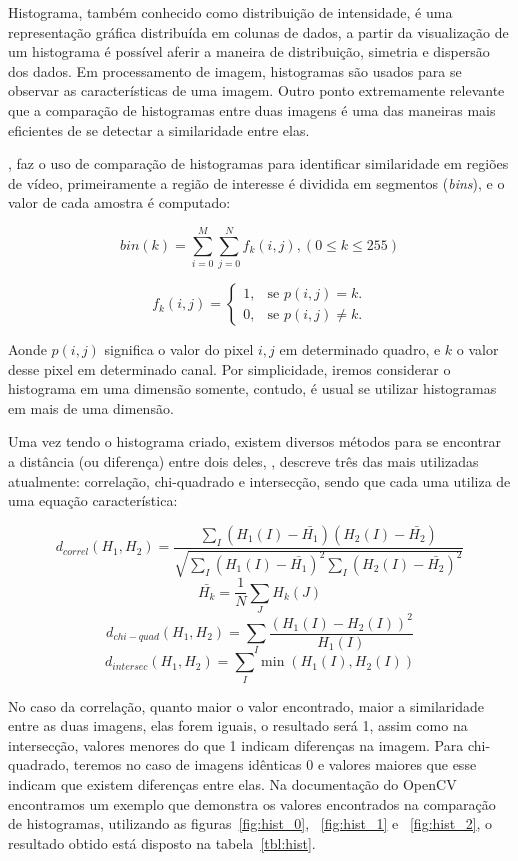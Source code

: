 \documentclass[ecp,tc]{iiufrgs}
\begin{document}
Histograma, também conhecido como distribuição de intensidade, é uma representação gráfica distribuída em colunas de dados, a partir da visualização de um histograma é possível aferir a maneira de distribuição, simetria e dispersão dos dados. Em processamento de imagem, histogramas são usados para se observar as características de uma imagem. Outro ponto extremamente relevante que a comparação de histogramas entre duas imagens é uma das maneiras mais eficientes de se detectar a similaridade entre elas.

, faz o uso de comparação de histogramas para identificar similaridade em regiões de vídeo, primeiramente a região de interesse é dividida em segmentos (\textit{bins}), e o valor de cada amostra é computado:

\[
bin(k) = \sum_{i=0}^{M}\sum_{j=0}^{N}f_k(i,j),(0 \le k \le 255)
\]

\begin{equation}
f_k(i,j)=\begin{cases}
1, & \text{se $p(i,j) = k$}.\\
0, & \text{se $p(i,j) \neq k$}.
\end{cases}
\end{equation}

Aonde $ p(i,j) $ significa o valor do pixel $ i, j$ em determinado quadro, e $ k $ o valor desse pixel em determinado canal. Por simplicidade, iremos considerar o histograma em uma dimensão somente, contudo, é usual se utilizar histogramas em mais de uma dimensão.

Uma vez tendo o histograma criado, existem diversos métodos para se encontrar a distância (ou diferença) entre dois deles, , descreve três das mais utilizadas atualmente: correlação, chi-quadrado e intersecção, sendo que cada uma utiliza de uma equação característica:

\[
d_{correl}(H_1,H_2) =  \frac{\sum_I (H_1(I) - \bar{H_1}) (H_2(I) - \bar{H_2})}{\sqrt{\sum_I(H_1(I) - \bar{H_1})^2 \sum_I(H_2(I) - \bar{H_2})^2}}
\]
\[
\bar{H_k} =  \frac{1}{N} \sum _J H_k(J)
\]
\[
d_{chi-quad}(H_1,H_2) =  \sum _I  \frac{\left(H_1(I)-H_2(I)\right)^2}{H_1(I)}
\]
\[
d_{intersec}(H_1,H_2) =  \sum _I  \min (H_1(I), H_2(I))
\]

No caso da correlação, quanto maior o valor encontrado, maior a similaridade entre as duas imagens, elas forem iguais, o resultado será 1, assim como na intersecção, valores menores do que 1 indicam diferenças na imagem. Para chi-quadrado, teremos no caso de imagens idênticas 0 e valores maiores que esse indicam que existem diferenças entre elas. Na documentação do OpenCV encontramos um exemplo que demonstra os valores encontrados na comparação de histogramas, utilizando as figuras~\ref{fig:hist_0}, ~\ref{fig:hist_1} e ~\ref{fig:hist_2}, o resultado obtido está disposto na tabela~\ref{tbl:hist}.
\end{document}
